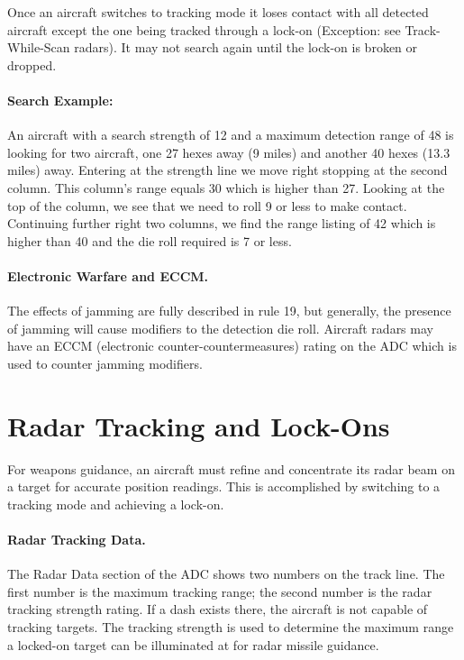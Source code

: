 {Once an aircraft switches to tracking mode it loses contact with all detected aircraft except the one being tracked through a lock-on (Exception: see Track-While-Scan radars). It may not search again until the lock-on is broken or dropped. 

\paragraph{Search Example:} An aircraft with a search strength of 12 and a maximum detection range of 48 is looking for two aircraft, one 27 hexes away (9 miles) and another 40 hexes (13.3 miles) away. Entering at the strength line we move right stopping at the second column. This column's range equals 30 which is higher than 27. Looking at the top of the column, we see that we need to roll 9 or less to make contact. Continuing further right two columns, we find the range listing of 42 which is higher than 40 and the die roll required is 7 or less.

\paragraph{Electronic Warfare and ECCM.} The effects of jamming are fully described in rule 19, but generally, the presence of jamming will cause modifiers to the detection die roll. Aircraft radars may have an ECCM (electronic counter-countermeasures) rating on the ADC which is used to counter jamming modifiers.

\section{Radar Tracking and Lock-Ons}
\label{rule:radar-tracking-and-lock-ons}

For weapons guidance, an aircraft must refine and concentrate its radar beam on a target for accurate position readings. This is accomplished by switching to a tracking mode and achieving a lock-on.

\paragraph{Radar Tracking Data.} The Radar Data section of the ADC shows two numbers on the track line. The first number is the maximum tracking range; the second number is the radar tracking strength rating. If a dash exists there, the aircraft is not capable of tracking targets. The tracking strength is used to determine the maximum range a locked-on target can be illuminated at for radar missile guidance.

}
